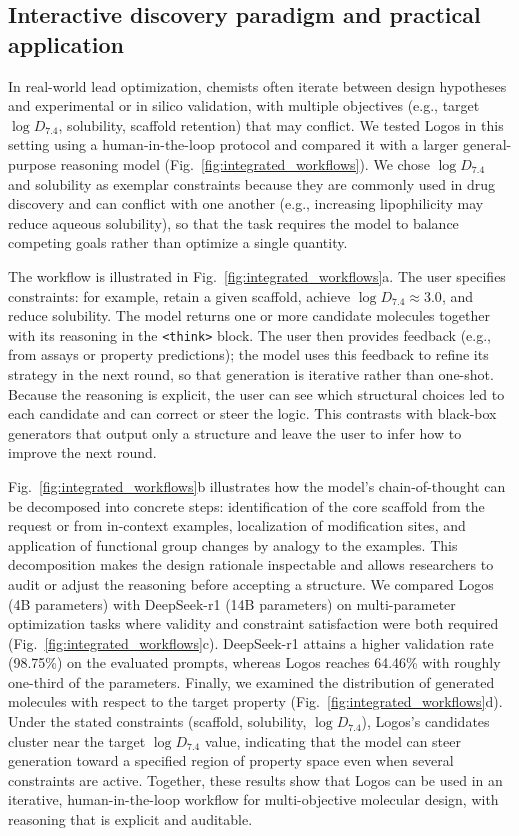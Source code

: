 \documentclass[11pt]{article}
\begin{document}
\subsection{Interactive discovery paradigm and practical application}

In real-world lead optimization, chemists often iterate between design hypotheses and experimental or in silico validation, with multiple objectives (e.g., target $\log D_{7.4}$, solubility, scaffold retention) that may conflict\cite{waring2010lipophilicity,d2012multi}. We tested Logos in this setting using a human-in-the-loop protocol and compared it with a larger general-purpose reasoning model (Fig.~\ref{fig:integrated_workflows}). We chose $\log D_{7.4}$ and solubility as exemplar constraints because they are commonly used in drug discovery and can conflict with one another (e.g., increasing lipophilicity may reduce aqueous solubility), so that the task requires the model to balance competing goals rather than optimize a single quantity.

The workflow is illustrated in Fig.~\ref{fig:integrated_workflows}a. The user specifies constraints: for example, retain a given scaffold, achieve $\log D_{7.4} \approx 3.0$, and reduce solubility. The model returns one or more candidate molecules together with its reasoning in the \texttt{<think>} block. The user then provides feedback (e.g., from assays or property predictions); the model uses this feedback to refine its strategy in the next round, so that generation is iterative rather than one-shot. Because the reasoning is explicit, the user can see which structural choices led to each candidate and can correct or steer the logic. This contrasts with black-box generators that output only a structure and leave the user to infer how to improve the next round.

Fig.~\ref{fig:integrated_workflows}b illustrates how the model's chain-of-thought can be decomposed into concrete steps: identification of the core scaffold from the request or from in-context examples, localization of modification sites, and application of functional group changes by analogy to the examples. This decomposition makes the design rationale inspectable and allows researchers to audit or adjust the reasoning before accepting a structure. We compared Logos (4B parameters) with DeepSeek-r1 (14B parameters) on multi-parameter optimization tasks where validity and constraint satisfaction were both required (Fig.~\ref{fig:integrated_workflows}c). DeepSeek-r1 attains a higher validation rate (98.75\%) on the evaluated prompts, whereas Logos reaches 64.46\% with roughly one-third of the parameters. Finally, we examined the distribution of generated molecules with respect to the target property (Fig.~\ref{fig:integrated_workflows}d). Under the stated constraints (scaffold, solubility, $\log D_{7.4}$), Logos's candidates cluster near the target $\log D_{7.4}$ value, indicating that the model can steer generation toward a specified region of property space even when several constraints are active. Together, these results show that Logos can be used in an iterative, human-in-the-loop workflow for multi-objective molecular design, with reasoning that is explicit and auditable.
\end{document}
